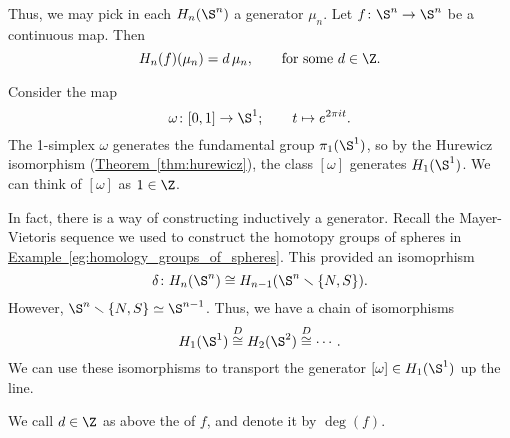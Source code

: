 \documentclass[main.tex]{subfiles}
\begin{document}
Thus, we may pick in each $H_{n}(\S^{n})$ a generator $\mu_{n}$. Let $f\colon \S^{n} \to \S^{n}$ be a continuous map. Then
\begin{equation*}
  H_{n}(f)(\mu_{n}) = d\, \mu_{n},\qquad \text{for some }d \in \Z.
\end{equation*}

\begin{example}
  Consider the map
  \begin{equation*}
    \omega\colon [0, 1] \to \S^{1};\qquad t \mapsto e^{2 \pi i t}.
  \end{equation*}
  The 1-simplex $\omega$ generates the fundamental group $\pi_{1}(\S^{1})$, so by the Hurewicz isomorphism (\hyperref[thm:hurewicz]{Theorem~\ref*{thm:hurewicz}}), the class $[\omega]$ generates $H_{1}(\S^{1})$. We can think of $[\omega]$ as $1 \in \Z$.
\end{example}

In fact, there is a way of constructing inductively a generator. Recall the Mayer-Vietoris sequence we used to construct the homotopy groups of spheres in \hyperref[eg:homology_groups_of_spheres]{Example~\ref*{eg:homology_groups_of_spheres}}. This provided an isomoprhism
\begin{equation*}
  \delta\colon H_{n}(\S^{n}) \cong H_{n-1}(\S^{n} \smallsetminus \{N, S\}).
\end{equation*}
However, \(\S^{n}\smallsetminus\{N, S\} \simeq \S^{n-1}\). Thus, we have a chain of isomorphisms
\begin{equation*}
  H_{1}(\S^{1}) \overset{D}{\cong} H_{2}(\S^{2}) \overset{D}{\cong} \cdots.
\end{equation*}
We can use these isomorphisms to transport the generator \([\omega] \in H_{1}(\S^{1})\) up the line.

\begin{definition}
  \label{def:mapping_degree}
  We call $d \in \Z$ as above the  of $f$, and denote it by $\deg(f)$.
\end{definition}
\end{document}
